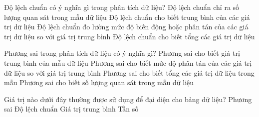 \begin{ex}%
	Độ lệch chuẩn có ý nghĩa gì trong phân tích dữ liệu?
	\choice
	{Độ lệch chuẩn chỉ ra số lượng quan sát trong mẫu dữ liệu}
	{Độ lệch chuẩn cho biết trung bình của các giá trị dữ liệu}
	{\True Độ lệch chuẩn đo lường mức độ biến động hoặc phân tán của các giá trị dữ liệu so với giá trị trung bình}
	{Độ lệch chuẩn cho biết tổng các giá trị dữ liệu}
\end{ex}

\begin{ex}%
	Phương sai trong phân tích dữ liệu có ý nghĩa gì?
	\choice
	{Phương sai cho biết giá trị trung bình của mẫu dữ liệu}
	{\True Phương sai cho biết mức độ phân tán của các giá trị dữ liệu so với giá trị trung bình}
	{Phương sai cho biết tổng các giá trị dữ liệu trong mẫu}
	{Phương sai cho biết số lượng quan sát trong mẫu dữ liệu}
\end{ex}

\begin{ex}%
	Giá trị nào dưới đây thường được sử dụng để đại diện cho bảng dữ liệu?
	\choice
	{Phương sai}
	{Độ lệch chuẩn}
	{\True Giá trị trung bình}
	{Tần số}
\end{ex}

